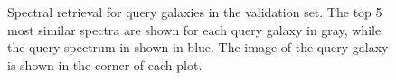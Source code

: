 \documentclass[draft, a4paper,12pt]{article}
\begin{document}
\begin{figure}[H]

    \caption{Spectral retrieval for query galaxies in the validation set. The top 5 most similar spectra are shown for each query galaxy in gray, while the query spectrum in shown in blue. The image of the query galaxy is shown in the corner of each plot.
    }
    \label{fig:spectral_retrieval}
\end{figure}




\end{document}
